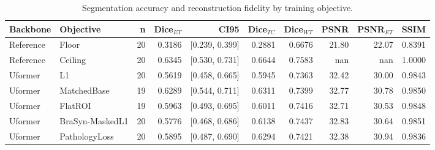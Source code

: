 \begin{table}[t]
\centering
\caption{Segmentation accuracy and reconstruction fidelity by training objective.}
\begin{tabular}{llrrrrrrrr}
\hline
Backbone & Objective & n & Dice$_{ET}$ & CI95 & Dice$_{TC}$ & Dice$_{WT}$ & PSNR & PSNR$_{ET}$ & SSIM \\
\hline
Reference & Floor & 20 & 0.3186 & [0.239, 0.399] & 0.2881 & 0.6676 & 21.80 & 22.07 & 0.8391 \\
Reference & Ceiling & 20 & 0.6345 & [0.530, 0.731] & 0.6644 & 0.7583 & nan & nan & 1.0000 \\
Uformer & L1 & 20 & 0.5619 & [0.458, 0.665] & 0.5945 & 0.7363 & 32.42 & 30.00 & 0.9843 \\
Uformer & MatchedBase & 19 & 0.6289 & [0.544, 0.711] & 0.6311 & 0.7399 & 32.77 & 30.78 & 0.9850 \\
Uformer & FlatROI & 19 & 0.5963 & [0.493, 0.695] & 0.6011 & 0.7416 & 32.71 & 30.53 & 0.9848 \\
Uformer & BraSyn-MaskedL1 & 20 & 0.5776 & [0.468, 0.686] & 0.6138 & 0.7437 & 32.83 & 30.64 & 0.9851 \\
Uformer & PathologyLoss & 20 & 0.5895 & [0.487, 0.690] & 0.6294 & 0.7421 & 32.38 & 30.94 & 0.9836 \\
\hline
\end{tabular}
\end{table}
